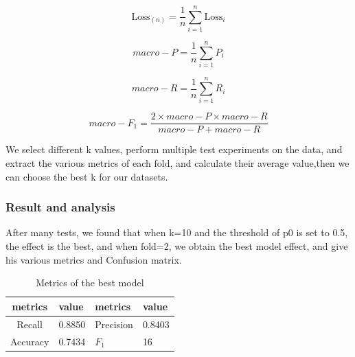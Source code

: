\documentclass[12pt]{article}
\begin{document}

\begin{equation}
\mathrm{Loss}_{(n)}=\frac{1}{n} \sum_{i=1}^{n} \mathrm{Loss}_{i}
\end{equation}

\begin{equation}
macro-P=\frac{1}{n} \sum_{i=1}^{n} P_{i}
\end{equation}

\begin{equation}
macro-R=\frac{1}{n} \sum_{i=1}^{n} R_{i}
\end{equation}

\begin{equation}
macro-{F_1} = \frac{2 \times macro-P \times macro-R}{macro-P+macro-R}
\end{equation}

We select different k values, perform multiple test experiments on the data, and extract the various metrics of each fold, and calculate their average value,then we can choose the best k for our datasets.

\subsubsection{Result and analysis}
After many tests, we found that when k=10 and the threshold of p0 is set to 0.5, the effect is the best, and when fold=2, we obtain the best model effect, and give his various metrics and Confusion matrix.
\begin{table}[H]
	\centering
	\caption{Metrics of the best model}\label{y}
	\begin{tabularx}{0.45\textwidth}{clll}
		\toprule
		 metrics & value &  metrics & value  \\
		\midrule
		Recall & 0.8850  &  Precision & 0.8403\\
		Accuracy & 0.7434 & $F_1$ & 16\\
		\bottomrule
	\end{tabularx}
\end{table}	
\end{document}
